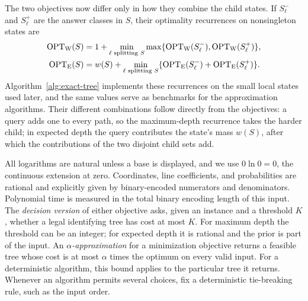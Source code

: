 The two objectives now differ only in how they combine the child
states. If $S_\ell^-$ and $S_\ell^+$ are the answer classes in $S$,
their optimality recurrences on nonsingleton states are
\[
 \begin{split}
 \operatorname{OPT}_{\mathrm W}(S)&=1+\min_{\ell\text{ splitting }S}
                    \max\{\operatorname{OPT}_{\mathrm W}(S_\ell^-),
                         \operatorname{OPT}_{\mathrm W}(S_\ell^+)\},\\
 \operatorname{OPT}_{\mathrm E}(S)&=w(S)+\min_{\ell\text{ splitting }S}
                    \{\operatorname{OPT}_{\mathrm E}(S_\ell^-)
                      +\operatorname{OPT}_{\mathrm E}(S_\ell^+)\}.
 \end{split}
\]
Algorithm~\ref{alg:exact-tree} implements these recurrences on the
small local states used later, and the same values serve as benchmarks
for the approximation algorithms. Their different combinations follow
directly from the objectives: a query adds one to every path, so the
maximum-depth recurrence takes the harder child; in expected depth the
query contributes the state's mass $w(S)$, after which the contributions
of the two disjoint child sets add.



All logarithms are natural unless a base is displayed, and
we use $0\ln0=0$, the continuous extension at zero.
Coordinates, line coefficients, and probabilities are rational
and explicitly given by binary-encoded numerators and denominators.
Polynomial time is measured in the total binary encoding length of
this input.
The \emph{decision version} of either objective asks, given an
instance and a threshold $K$, whether a legal identifying tree
has cost at most $K$. For maximum depth the threshold can be
an integer; for expected depth it is rational and the prior is
part of the input.
An \emph{$\alpha$-approximation} for a minimization objective returns
a feasible tree whose cost is at most $\alpha$ times the optimum
on every valid input. For a deterministic algorithm, this bound
applies to the particular tree it returns.
Whenever an algorithm permits several choices, fix a deterministic
tie-breaking rule, such as the input order.

